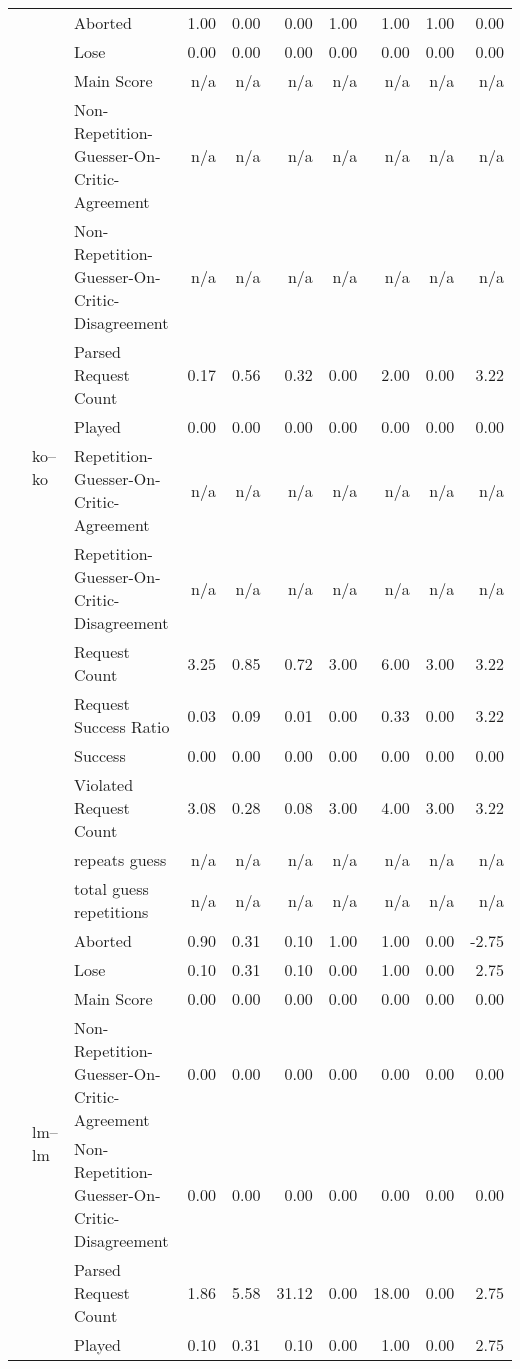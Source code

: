 \begin{tabular}{lllrrrrrrr}
\cline{2-10}
 & \multirow[t]{15}{*}{ko--ko} & Aborted & 1.00 & 0.00 & 0.00 & 1.00 & 1.00 & 1.00 & 0.00 \\
 &  & Lose & 0.00 & 0.00 & 0.00 & 0.00 & 0.00 & 0.00 & 0.00 \\
 &  & Main Score & n/a & n/a & n/a & n/a & n/a & n/a & n/a \\
 &  & Non-Repetition-Guesser-On-Critic-Agreement & n/a & n/a & n/a & n/a & n/a & n/a & n/a \\
 &  & Non-Repetition-Guesser-On-Critic-Disagreement & n/a & n/a & n/a & n/a & n/a & n/a & n/a \\
 &  & Parsed Request Count & 0.17 & 0.56 & 0.32 & 0.00 & 2.00 & 0.00 & 3.22 \\
 &  & Played & 0.00 & 0.00 & 0.00 & 0.00 & 0.00 & 0.00 & 0.00 \\
 &  & Repetition-Guesser-On-Critic-Agreement & n/a & n/a & n/a & n/a & n/a & n/a & n/a \\
 &  & Repetition-Guesser-On-Critic-Disagreement & n/a & n/a & n/a & n/a & n/a & n/a & n/a \\
 &  & Request Count & 3.25 & 0.85 & 0.72 & 3.00 & 6.00 & 3.00 & 3.22 \\
 &  & Request Success Ratio & 0.03 & 0.09 & 0.01 & 0.00 & 0.33 & 0.00 & 3.22 \\
 &  & Success & 0.00 & 0.00 & 0.00 & 0.00 & 0.00 & 0.00 & 0.00 \\
 &  & Violated Request Count & 3.08 & 0.28 & 0.08 & 3.00 & 4.00 & 3.00 & 3.22 \\
 &  & repeats guess & n/a & n/a & n/a & n/a & n/a & n/a & n/a \\
 &  & total guess repetitions & n/a & n/a & n/a & n/a & n/a & n/a & n/a \\
\cline{2-10}
 & \multirow[t]{15}{*}{lm--lm} & Aborted & 0.90 & 0.31 & 0.10 & 1.00 & 1.00 & 0.00 & -2.75 \\
 &  & Lose & 0.10 & 0.31 & 0.10 & 0.00 & 1.00 & 0.00 & 2.75 \\
 &  & Main Score & 0.00 & 0.00 & 0.00 & 0.00 & 0.00 & 0.00 & 0.00 \\
 &  & Non-Repetition-Guesser-On-Critic-Agreement & 0.00 & 0.00 & 0.00 & 0.00 & 0.00 & 0.00 & 0.00 \\
 &  & Non-Repetition-Guesser-On-Critic-Disagreement & 0.00 & 0.00 & 0.00 & 0.00 & 0.00 & 0.00 & 0.00 \\
 &  & Parsed Request Count & 1.86 & 5.58 & 31.12 & 0.00 & 18.00 & 0.00 & 2.75 \\
 &  & Played & 0.10 & 0.31 & 0.10 & 0.00 & 1.00 & 0.00 & 2.75 \\

\end{tabular}
